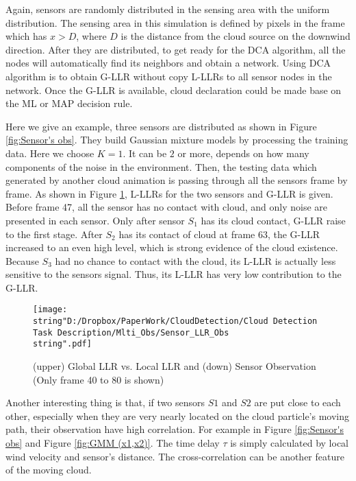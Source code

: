 Again, sensors are randomly distributed in the sensing area with the
uniform distribution. The sensing area in this simulation is defined
by pixels in the frame which has $x>D$, where $D$ is the distance
from the cloud source on the downwind direction. After they are distributed,
to get ready for the DCA algorithm, all the nodes will automatically
find its neighbors and obtain a network. Using DCA algorithm is to
obtain G-LLR without copy L-LLRs to all sensor nodes in the network.
Once the G-LLR is available, cloud declaration could be made base
on the ML or MAP decision rule.

Here we give an example, three sensors are distributed as shown in
Figure \ref{fig:Sensor's obs}. They build Gaussian mixture models
by processing the training data. Here we choose $K=1$. It can be
$2$ or more, depends on how many components of the noise in the environment.
Then, the testing data which generated by another cloud animation
is passing through all the sensors frame by frame. As shown in Figure
\ref{fig:Global-LLR-and}, L-LLRs for the two sensors and G-LLR is
given. Before frame 47, all the sensor has no contact with cloud,
and only noise are presented in each sensor. Only after sensor $S_{1}$
has its cloud contact, G-LLR raise to the first stage. After $S_{2}$
has its contact of cloud at frame 63, the G-LLR increased to an even
high level, which is strong evidence of the cloud existence. Because
$S_{3}$ had no chance to contact with the cloud, its L-LLR is actually
less sensitive to the sensors signal. Thus, its L-LLR has very low
contribution to the G-LLR. 

\begin{figure}
\hfill{}\texttt{[image: \\string"D:/Dropbox/PaperWork/CloudDetection/Cloud Detection Task Description/Mlti\_Obs/Sensor\_LLR\_Obs\\string".pdf]}\hfill{}\hfill{}\caption{\label{fig:Global-LLR-and}(upper) Global LLR vs. Local LLR and (down)
Sensor Observation (Only frame 40 to 80 is shown)}
\end{figure}


Another interesting thing is that, if two sensors $S1$ and $S2$
are put close to each other, especially when they are very nearly
located on the cloud particle's moving path, their observation have
high correlation. For example in Figure \ref{fig:Sensor's obs} and
Figure \ref{fig:GMM (x1,x2)}. The time delay $\tau$ is simply calculated
by local wind velocity and sensor\textquoteright{}s distance. The
cross-correlation can be another feature of the moving cloud.

